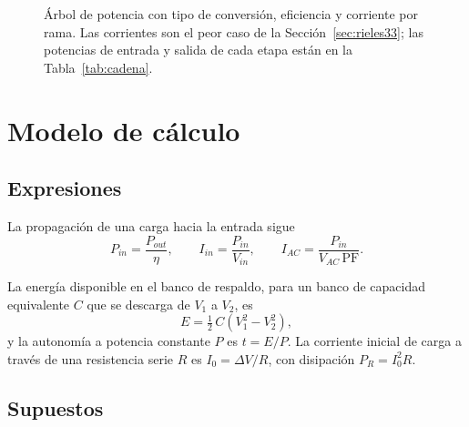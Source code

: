 \documentclass[11pt,a4paper]{article}
\begin{document}
\begin{figure}[H]
\caption{Árbol de potencia con tipo de conversión, eficiencia y corriente por
rama. Las corrientes son el peor caso de la Sección~\ref{sec:rieles33}; las
potencias de entrada y salida de cada etapa están en la Tabla~\ref{tab:cadena}.}
\label{fig:arbol}
\end{figure}

\section{Modelo de cálculo}
\label{sec:modelo}

\subsection{Expresiones}

La propagación de una carga hacia la entrada sigue
\begin{equation}
P_{in} = \frac{P_{out}}{\eta}, \qquad
I_{in} = \frac{P_{in}}{V_{in}}, \qquad
I_{AC} = \frac{P_{in}}{V_{AC}\,\mathrm{PF}} .
\label{eq:cadena}
\end{equation}

La energía disponible en el banco de respaldo, para un banco de capacidad
equivalente $C$ que se descarga de $V_1$ a $V_2$, es
\begin{equation}
E = \tfrac{1}{2}\,C\left(V_1^2 - V_2^2\right),
\label{eq:energia}
\end{equation}
y la autonomía a potencia constante $P$ es $t = E/P$. La corriente inicial de
carga a través de una resistencia serie $R$ es $I_0 = \Delta V/R$, con
disipación $P_R = I_0^2 R$.

\subsection{Supuestos}
\end{document}

